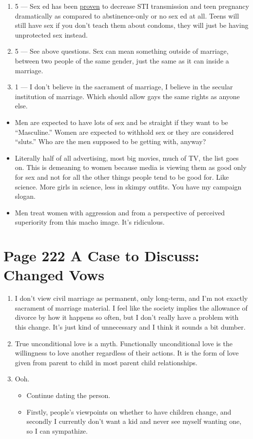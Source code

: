 \documentclass[11pt]{article}
\begin{document}
\begin{enumerate}
	\item 5 --- Sex ed has been \underline{proven} to decrease STI transmission 
		and teen pregnancy dramatically as compared to abstinence-only or no sex ed
		at all.  Teens will still have sex if you don't teach them about condoms, 
		they will just be having unprotected sex instead.
	\item 5 --- See above questions.  Sex can mean something outside of marriage, 
		between two people of the same gender, just the same as it can inside a
		marriage.
	\item 1 --- I don't believe in the sacrament of marriage, I believe in the
		secular institution of marriage.  Which should allow gays the same rights
		as anyone else.
\end{enumerate}
\begin{itemize}
	\item Men are expected to have lots of sex and be straight if they want to be
		``Masculine.''  Women are expected to withhold sex or they are considered 
		``sluts.'' Who are the men supposed to be getting with, anyway?
	\item Literally half of all advertising, most big movies, much of TV, the
		list goes on.  This is demeaning to women because media is viewing them
		as good only for sex and not for all the other things people tend to be 
		good for.  Like science.  More girls in science, less in skimpy outfits.
		You have my campaign slogan.
	\item Men treat women with aggression and from a perspective of perceived 
		superiority from this macho image.  It's ridiculous.
\end{itemize}

\section{Page 222 A Case to Discuss: Changed Vows}
\begin{enumerate}
	\item I don't view civil marriage as permanent, only long-term, and I'm not
		exactly sacrament of marriage material.  I feel like the society implies
		the allowance of divorce by how it happens so often, but I don't really
		have a problem with this change.  It's just kind of unnecessary and I think
		it sounds a bit dumber.
	\item True unconditional love is a myth.  Functionally unconditional love is 
		the willingness to love another regardless of their actions.  It is the
		form of love given from parent to child in most parent child relationships.
	\item Ooh.
		\begin{itemize}
			\item Continue dating the person.
			\item Firstly, people's viewpoints on whether to have children change, and
				secondly I currently don't want a kid and never see myself wanting one,
				so I can sympathize.
		\end{itemize}
\end{enumerate}
\end{document}

